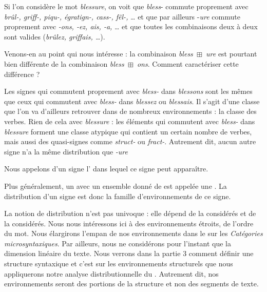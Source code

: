 Si l’on considère le mot \textit{blessure}, on voit que \textit{bless}{}- commute proprement avec \textit{brûl-, griff-, piqu-, égratign-, cass-, fêl-,} … et que par ailleurs -\textit{ure} commute proprement avec \textit{{}-ons, -ez, ais, -a,} … et que toutes les combinaisons deux à deux sont valides (\textit{brûlez, griffais, …}).

Venons-en au point qui nous intéresse : la combinaison \textit{bless~}${\boxplus}$\textit{~ure} est pourtant bien différente de la combinaison \textit{bless~}${\boxplus}$\textit{~ons}. Comment caractériser cette différence ?

Les signes qui commutent proprement avec \textit{bless-} dans \textit{blessons} sont les mêmes que ceux qui commutent avec \textit{bless-} dans \textit{blessez} ou \textit{blessais}. Il s’agit d’une classe que l’on va d’ailleurs retrouver dans de nombreux environnements : la classe des verbes. Rien de cela avec \textit{blessure} : les éléments qui commutent avec \textit{bless-} dans \textit{blessure} forment une classe atypique qui contient un certain nombre de verbes, mais aussi des quasi-signes comme \textit{struct-} ou \textit{fract-}. Autrement dit, aucun autre signe n’a la même distribution que \textit{{}-ure}

{Nous appelons  d’un signe l’ dans lequel ce signe peut apparaître.}

{Plus généralement, un   avec un ensemble donné de  est appelée une . La distribution d’un signe est donc la famille d’environnements de ce signe.}

La notion de distribution n’est pas univoque : elle dépend de la  considérés et de la  considérés. Nous nous intéressons ici à des environnements étroits, de l’ordre du mot. Nous élargirons l’empan de nos environnements dans le  sur les \textit{Catégories microsyntaxiques}. Par ailleurs, nous ne considérons pour l’instant que la dimension linéaire du texte. Nous verrons dans la partie 3 comment définir une structure syntaxique et c’est sur les environnements structurels que nous appliquerons notre analyse distributionnelle du . Autrement dit, nos environnements seront des portions de la structure et non des segments de texte.

